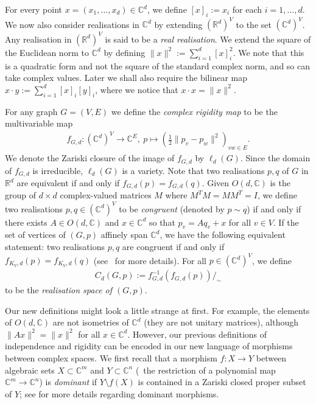 For every point  $x=(x_1,\ldots,x_d) \in \mathbb{C}^d$,
we define $[x]_i := x_i$ for each $i =1,\ldots,d$.
We now also consider realisations in $\mathbb{C}^d$ by extending $(\mathbb{R}^d)^V$ to the set $(\mathbb{C}^d)^V$.
Any realisation in $(\mathbb{R}^d)^V$ is said to be a \emph{real realisation}.
We extend the square of the Euclidean norm to $\mathbb{C}^d$ by defining $\|x\|^2 := \sum_{i=1}^d [x]_i^2$.
We note that this is a quadratic form and not the square of the standard complex norm,
and so can take complex values.
Later we shall also require the bilinear map $x \cdot y := \sum_{i =1}^d [x]_i [y]_i$,
where we notice that $x \cdot x = \| x\|^2$.

For any graph $G=(V,E)$ we define the \emph{complex rigidity map} to be the multivariable map
\begin{align*}
	f_{G,d} : (\mathbb{C}^{d})^V \rightarrow \mathbb{C}^E, ~ p \mapsto \left( \frac{1}{2}\|p_v-p_w\|^2 \right)_{vw \in E}.
\end{align*}
We denote the Zariski closure of the image of $f_{G,d}$ by $\ell_d(G)$.
Since the domain of $f_{G,d}$ is irreducible,
$\ell_d(G)$ is a variety.
Note that two realisations $p,q$ of $G$ in $\mathbb{R}^d$ are equivalent if and only if $f_{G,d}(p)=f_{G,d}(q)$.
Given $O(d, \mathbb{C})$ is the group of $d \times d$ complex-valued matrices $M$ where $M^T M = M M^T = I$,
we define two realisations $p,q \in (\mathbb{C}^{d})^V$ to be \emph{congruent} (denoted by $p \sim q$) if and only if there exists $A \in O(d, \mathbb{C})$ and $x \in \mathbb{C}^{d}$ so that $p_v = Aq_v + x$ for all $v \in V$.
If the set of vertices of $(G,p)$ affinely span $\mathbb{C}^d$,
we have the following equivalent statement:
two realisations $p,q$ are congruent if and only if $f_{K_V,d}(p) = f_{K_V,d}(q)$ (see~\cite[Section 10]{Gortler2014} for more details).
For all $p \in (\mathbb{C}^{d})^V$,
we define 
\begin{align*}
	C_d(G,p) := f^{-1}_{G,d} (f_{G,d}(p))/_\sim
\end{align*}
to be the \emph{realisation space of $(G,p)$}.

Our new definitions might look a little strange at first.
For example,
the elements of $O(d, \mathbb{C})$ are not isometries of $\mathbb{C}^d$ (\ie they are not unitary matrices),
although $\|Ax\|^2 = \|x\|^2$ for all $x \in \mathbb{C}^d$.
However, our previous definitions of independence and rigidity can be encoded in our new language of morphisms between complex spaces.
We first recall that a morphism $f : X \rightarrow Y$ between algebraic sets $X \subset \mathbb{C}^m$ and $Y \subset \mathbb{C}^n$ (\ie~the restriction of a polynomial map $\mathbb{C}^m \rightarrow \mathbb{C}^n$) is \emph{dominant} if $Y \setminus f(X)$ is contained in a Zariski closed proper subset of $Y$;
see  for more details regarding dominant morphisms.


